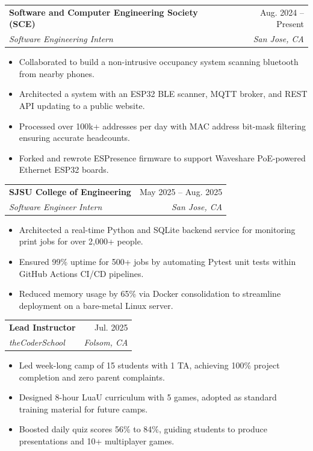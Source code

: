 \documentclass[letterpaper,11pt]{article}
\makeatletter
\newcommand{\resumeItem}[1]{
  \item\small{
    {#1 \vspace{-2pt}}
  }
}
\newcommand{\resumeSubheading}[4]{
  \vspace{-2pt}\item
    \begin{tabular*}{0.97\textwidth}[t]{l@{\extracolsep{\fill}}r}
      \textbf{#1} & #2 \\
      \textit{\small#3} & \textit{\small #4} \\
    \end{tabular*}\vspace{-7pt}
}
\newcommand{\resumeItemListStart}{\begin{itemize}}
\newcommand{\resumeItemListEnd}{\end{itemize}\vspace{-5pt}}
\makeatother
\begin{document}
\resumeSubheading
{Software and Computer Engineering Society (SCE)}{Aug. 2024 -- Present}
{Software Engineering Intern}{San Jose, CA}
\resumeItemListStart
\resumeItem{Collaborated to build a non-intrusive occupancy system scanning bluetooth from nearby phones.}
\resumeItem{Architected a system with an ESP32 BLE scanner, MQTT broker, and REST API updating to a public website.}
\resumeItem{Processed over 100k+ addresses per day with MAC address bit-mask filtering ensuring accurate headcounts.}
\resumeItem{Forked and rewrote ESPresence firmware to support Waveshare PoE-powered Ethernet ESP32 boards.}



\resumeItemListEnd

\resumeSubheading
{SJSU College of Engineering}{May 2025 -- Aug. 2025}
{Software Engineer Intern}{San Jose, CA}
\resumeItemListStart
\resumeItem{Architected a real-time Python and SQLite backend service for monitoring print jobs for over 2,000+ people.}
\resumeItem{Ensured 99\% uptime for 500+ jobs by automating Pytest unit tests within GitHub Actions CI/CD pipelines.}
\resumeItem{Reduced memory usage by 65\% via Docker consolidation to streamline deployment on a bare-metal Linux server.}
\resumeItemListEnd

\resumeSubheading
{Lead Instructor}{Jul. 2025}
{theCoderSchool}{Folsom, CA}
\resumeItemListStart
\resumeItem{Led week-long camp of 15 students with 1 TA, achieving 100\% project completion and zero parent complaints.}
\resumeItem{Designed 8-hour LuaU curriculum with 5 games, adopted as standard training material for future camps.}
\resumeItem{Boosted daily quiz scores 56\% to 84\%, guiding students to produce presentations and 10+ multiplayer games.}
\resumeItemListEnd

\end{document}
